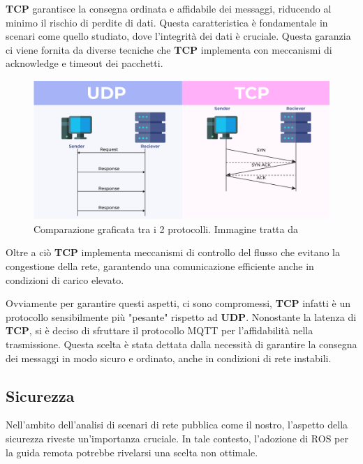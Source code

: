 \noindent \textbf{TCP} garantisce la consegna ordinata e affidabile dei messaggi, riducendo al minimo il rischio di perdite di dati. Questa caratteristica è fondamentale in scenari come quello studiato, dove l'integrità dei dati è cruciale. Questa garanzia ci viene fornita da diverse tecniche che \textbf{TCP} implementa con meccanismi di acknowledge e timeout dei pacchetti. 

\begin{figure}[H]
  \centering
  \includegraphics[width=1\textwidth]{figures/tcp_vs_udp_geeksforgeeks.png}
  \caption{Comparazione graficata tra i 2 protocolli. Immagine tratta da \cite{TCPvsUDP_geeksforgeeks}}
  \label{Comparazione graficata tra i 2 protocolli}
\end{figure}

\noindent Oltre a ciò \textbf{TCP} implementa meccanismi di controllo del flusso che evitano la congestione della rete, garantendo una comunicazione efficiente anche in condizioni di carico elevato.

\noindent Ovviamente per garantire questi aspetti, ci sono compromessi, \textbf{TCP} infatti è un protocollo sensibilmente più "pesante" rispetto ad \textbf{UDP}. Nonostante la latenza di \textbf{TCP}, si è deciso di sfruttare il protocollo MQTT per l'affidabilità nella trasmissione. Questa scelta è stata dettata dalla necessità di garantire la consegna dei messaggi in modo sicuro e ordinato, anche in condizioni di rete instabili.

\subsection{Sicurezza}
\noindent Nell'ambito dell'analisi di scenari di rete pubblica come il nostro, l'aspetto della sicurezza riveste un'importanza cruciale. In tale contesto, l'adozione di ROS per la guida remota potrebbe rivelarsi una scelta non ottimale.


